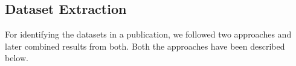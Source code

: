 \documentclass[runningheads]{llncs}
\begin{document}






\subsection{Dataset Extraction}
For identifying the datasets in a publication, we followed two approaches and later combined results from both. Both the approaches have been described below.
\end{document}
